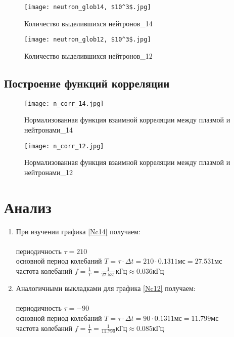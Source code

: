 \documentclass{article}
\begin{document}
\begin{figure}[H]
		\centering
		\texttt{[image: neutron\_glob14, \$10^3\$.jpg]}
		\caption{Количество выделившихся нейтронов\_14}
		\label{fig:NG14}
	\end{figure}
	
\begin{figure}[H]
		\centering
		\texttt{[image: neutron\_glob12, \$10^3\$.jpg]}
		\caption{Количество выделившихся нейтронов\_12}
		\label{fig:NG12}
	\end{figure}

\subsection{Построение функций корреляции}
	
\begin{figure}[H]
		\centering
		\texttt{[image: n\_corr\_14.jpg]}
		\caption{Нормализованная функция взаимной корреляции между плазмой и нейтронами\_14}
		\label{Nc14}
	\end{figure}

\begin{figure}[H]
		\centering
		\texttt{[image: n\_corr\_12.jpg]}
		\caption{Нормализованная функция взаимной корреляции между плазмой и нейтронами\_12}
		\label{Nc12}
	\end{figure}
	
\section{Анализ}
\begin{enumerate}
    \item При изучении графика \eqref{Nc14} получаем: \\\\
    периодичность $\tau = 210$\\
    основной период колебаний $T=\tau \cdot \Delta t=210\cdot 0.1311мс=27.531мс$\\
    частота колебаний $f=\frac{1}{T}=\frac{1}{27.531}кГц \approx 0.036кГц$\\
    \item Аналогичными выкладками для графика \eqref{Nc12} получаем:\\\\
    периодичность $\tau = -90$\\
    основной период колебаний $T=\tau \cdot \Delta t=90\cdot 0.1311мс=11.799мс$\\
    частота колебаний $f=\frac{1}{T}=\frac{1}{11.799}кГц \approx 0.085кГц$\\
\end{enumerate}
	
\end{document}
